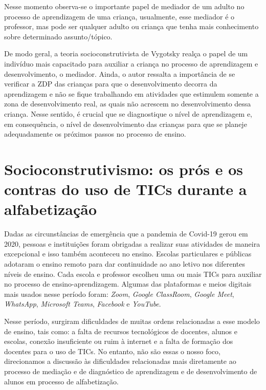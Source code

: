 \documentclass{textolivre}
\begin{document}
Nesse momento observa-se o importante papel de mediador de um adulto no processo de aprendizagem de uma criança, usualmente, esse mediador é o professor, mas pode ser qualquer adulto ou criança que tenha mais conhecimento sobre determinado assunto/tópico.

De modo geral, a teoria socioconstrutivista de Vygotsky realça o papel de um indivíduo mais capacitado para auxiliar a criança no processo de aprendizagem e desenvolvimento, o mediador. Ainda, o autor ressalta a importância de se verificar a ZDP das crianças para que o desenvolvimento decorra da aprendizagem e não se fique trabalhando em atividades que estimulem somente a zona de desenvolvimento real, as quais não acrescem no desenvolvimento dessa criança. Nesse sentido, é crucial que se diagnostique o nível de aprendizagem e, em consequência, o nível de desenvolvimento das crianças para que se planeje adequadamente os próximos passos no processo de ensino.

\section{Socioconstrutivismo: os prós e os contras do uso de TICs durante a alfabetização}\label{socio}
Dadas as circunstâncias de emergência que a pandemia de Covid-19 gerou em 2020, pessoas e instituições foram obrigadas a realizar suas atividades de maneira excepcional e isso também aconteceu no ensino. Escolas particulares e públicas adotaram o ensino remoto para dar continuidade ao ano letivo nos diferentes níveis de ensino. Cada escola e professor escolheu uma ou mais TICs para auxiliar no processo de ensino-aprendizagem. Algumas das plataformas e meios digitais mais usados nesse período foram: \emph{Zoom}, \emph{Google ClassRoom}, \emph{Google Meet}, \emph{WhatsApp}, \emph{Microsoft Teams}, \emph{Facebook} e \emph{YouTube}.

Nesse período, surgiram dificuldades de muitas ordens relacionadas a esse modelo de ensino, tais como: a falta de recursos tecnológicos de docentes, alunos e escolas, conexão insuficiente ou ruim à internet e a falta de formação dos docentes para o uso de TICs. No entanto, não são essas o nosso foco, direcionamos a discussão às dificuldades relacionadas mais diretamente ao processo de mediação e de diagnóstico de aprendizagem e de desenvolvimento de alunos em processo de alfabetização.
\end{document}
